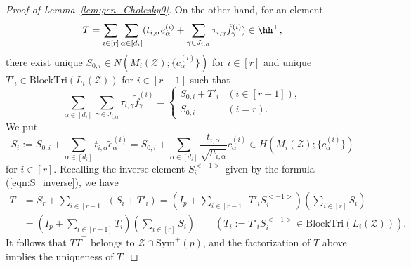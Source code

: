 \documentclass[12pt]{amsart}
\theoremstyle{plain}
\theoremstyle{definition}
\theoremstyle{remark}
\newcommand{\1}{\mathbf{1}}
\newcommand{\mytransp}[1]{ #1^{\top}}
\newcommand{\tri}{\mathrm{BlockTri}}
\begin{document}
\begin{proof}[Proof of Lemma~\ref{lem:gen_Cholesky0}]
 
On the other hand,
 for an element
 $$ T = \sum_{i \in [r]} \sum_{\alpha\in[d_i]} (t_{i,\alpha}  \tilde{e}^{(i)}_\alpha
   + \sum_{\gamma\in J_{i,\alpha}} \tau_{i,\gamma} \tilde{f}^{(i)}_\gamma ) \in \hh^+, $$
 there exist unique $S_{0,i} \in N(M_i(\mathcal{Z}); \{c^{(i)}_\alpha \} )$ for $i \in [r]$
 and unique $T'_i \in \tri(L_i(\mathcal{Z}))$ for $i \in [r-1]$ such that
 $$
 \sum_{\alpha\in[d_i]} \sum_{\gamma\in J_{i,\alpha}} \tau_{i,\gamma} \tilde{f}^{(i)}_\gamma
 = \begin{cases} S_{0,i} + T'_i & (i \in [r-1]), \\ S_{0,i} & (i=r). \end{cases} 
 $$
We put
 $$S_i
  := S_{0,i} +  \sum_{\alpha\in[d_i]} t_{i,\alpha}  \tilde{e}^{(i)}_\alpha 
 = S_{0,i} +  \sum_{\alpha\in[d_i]} \frac{ t_{i,\alpha} }{\sqrt{\mu_{i,\alpha}}}  c^{(i)}_\alpha 
 \in H(M_i(\mathcal{Z}); \{ c^{(i)}_\alpha\} ) $$ 
 for $i \in [r]$.
Recalling the inverse element $S_i^{<-1>}$ given by the formula (\ref{eqn:S_inverse}), 
 we have
\begin{align*}
T &= S_r + \sum_{i \in [r-1]} (S_i + T'_i)
  = (I_p + \sum_{i \in [r-1]} T'_i S_i^{<-1>})(\sum_{i \in [r]} S_i) \\
  &= (I_p + \sum_{i \in [r-1]} T_i)(\sum_{i \in [r]} S_i) \qquad (T_i := T'_i S_i^{<-1>} \in \tri(L_i(\mathcal{Z}))).
\end{align*}
It follows that $T \mytransp{T}$ belongs to $\mathcal{Z} \cap \mathrm{Sym}^+(p)$, 
 and the factorization of $T$ above implies the uniqueness of $T$. 
 
 \end{proof}
 
\end{document}
